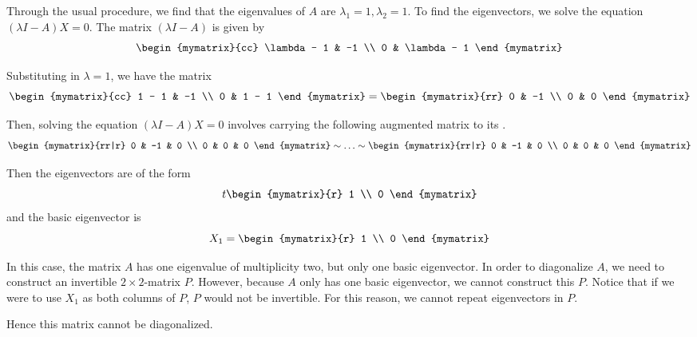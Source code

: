 \begin{solution}
Through the usual procedure, we find that the eigenvalues of $A$ are $\lambda_1 =1, \lambda_2=1$. 
To find the eigenvectors, we solve the equation $(\lambda I - A) X = 0$.
The matrix $(\lambda I -A)$ is given by 
\begin{equation*}
\begin{mymatrix}{cc}
\lambda - 1 & -1 \\
0 & \lambda - 1
\end{mymatrix}
\end{equation*}

Substituting in $\lambda = 1$, we have the matrix
\begin{equation*}
\begin{mymatrix}{cc}
1 - 1 & -1 \\
0 & 1 - 1
\end{mymatrix}
=
\begin{mymatrix}{rr}
0 & -1 \\
0 & 0
\end{mymatrix}
\end{equation*}

Then, solving the equation $(\lambda I - A) X = 0$ 
involves carrying the following augmented matrix to its {\rref}. 
\begin{equation*}
\begin{mymatrix}{rr|r}
0 & -1 & 0 \\
0 & 0 & 0
\end{mymatrix} 
\roweq\ldots\roweq
\begin{mymatrix}{rr|r}
0 & -1 & 0 \\
0 & 0 & 0
\end{mymatrix} 
\end{equation*}

Then the eigenvectors are of the form
\begin{equation*}
t\begin{mymatrix}{r}
1 \\
0
\end{mymatrix}
\end{equation*}
and the basic eigenvector is 
\begin{equation*}
X_1
=
\begin{mymatrix}{r}
1 \\
0
\end{mymatrix}
\end{equation*}

In this case, the matrix $A$ has one eigenvalue of multiplicity two, 
but only one basic eigenvector. In order to diagonalize $A$, we need to construct
an invertible $2\times 2$-matrix $P$. However, because $A$ only has one basic eigenvector,
we cannot construct this $P$. Notice that if we were to use $X_1$ as both columns of $P$, $P$ would not be invertible. For this reason, we cannot repeat eigenvectors in $P$.

Hence this matrix cannot be diagonalized. 
\end{solution}

